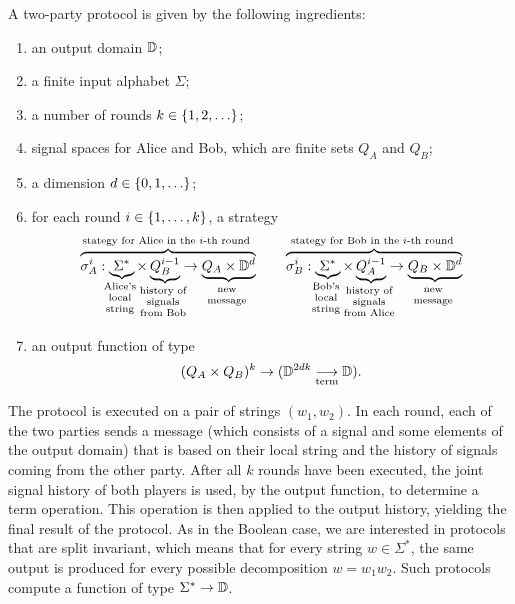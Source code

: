 \begin{definition}\label{def:two-party-protocol-general} A two-party protocol   
   is given by the following ingredients: 
  \begin{enumerate}
    \item an output domain $\mathbb D$;
    \item a finite input alphabet $\Sigma$;
    \item a number of rounds $k \in \{1,2,\ldots\}$;
    \item signal spaces for Alice and Bob, which are finite sets $Q_A$ and $Q_B$;
    \item a  dimension $d \in \{0,1,\ldots\}$;
    \item for each round $i \in \{1,\ldots,k\}$, a strategy
    \begin{align*}
    \myoverbrace{\sigma_A^i : \myunderbrace{\Sigma^*}{Alice's \\ local\\ string} \times \myunderbrace{Q_B^{i-1}}{history of \\ signals \\ from Bob}  \to \myunderbrace{Q_A \times \domain^d}{new\\ message}}{stategy for Alice in the $i$-th round}
    \qquad 
        \myoverbrace{\sigma_B^i : \myunderbrace{\Sigma^*}{Bob's \\ local\\ string} \times \myunderbrace{Q_A^{i-1}}{history of \\ signals \\ from Alice}  \to \myunderbrace{Q_B \times \domain^d}{new\\ message}}{stategy for Bob in the $i$-th round}
    \end{align*}
    \item an output function of type \begin{align*}
    (Q_A \times Q_B)^{k} \to (\mathbb D^{2dk} \underset{\text{term}}{\longrightarrow} \mathbb D).
    \end{align*}
  \end{enumerate}
\end{definition}



The protocol is executed on a pair of strings $(w_1,w_2)$. In each round, each of the two parties  sends a message (which consists of a signal and some elements of the output domain) that is based on their local string and the history of signals coming from the other party. After all $k$ rounds have been executed, the joint signal history of both players is used, by the output function, to determine a term operation. This operation is then applied to the output history, yielding the final result of the protocol. As in the Boolean case, we are interested in protocols that are split invariant, which means that for every string $w \in \Sigma^*$, the same output is produced for every possible decomposition $w = w_1 w_2$. Such protocols compute a function of type $\Sigma^* \to \mathbb D$. 

